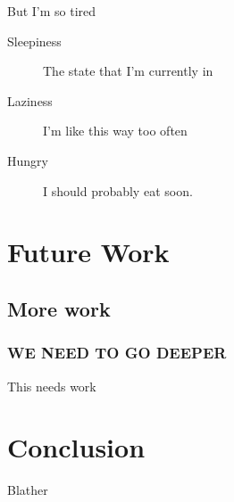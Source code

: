 \documentclass{acm_proc_article-sp}
\begin{document}
But I'm so tired 

\begin{description}
	\item[Sleepiness] The state that I'm currently in
	\item[Laziness] I'm like this way too often
	\item[Hungry] I should probably eat soon.
\end{description}

	
	


\section{Future Work}

    \subsection{More work}
    
    \subsubsection{WE NEED TO GO DEEPER}

    This needs work

\section{Conclusion}

	Blather

%


\begin{thebibliography}{1}


\end{thebibliography}


\balancecolumns
\end{document}
